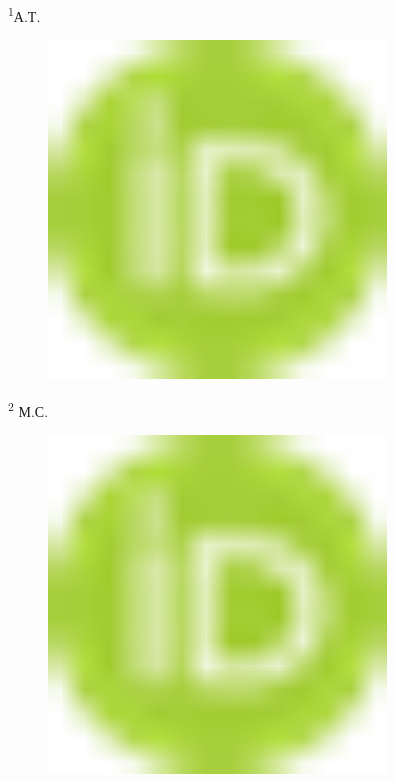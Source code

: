\textsuperscript{1}А.Т.
\begin{figure}[H]
	\centering
	\includegraphics[width=0.8\textwidth]{media/ict2/image6}
	\caption*{}
\end{figure}

\textsuperscript{2} М.С.
\begin{figure}[H]
	\centering
	\includegraphics[width=0.8\textwidth]{media/ict2/image6}
	\caption*{}
\end{figure}


